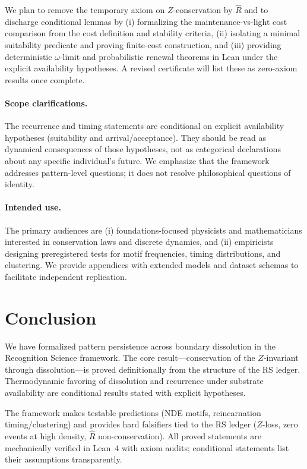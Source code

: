 \documentclass[11pt,letterpaper]{article}
\theoremstyle{definition}
\theoremstyle{remark}
\begin{document}
We plan to remove the temporary axiom on \(Z\)-conservation by \(\widehat{R}\) and to discharge conditional lemmas by (i) formalizing the maintenance-vs-light cost comparison from the cost definition and stability criteria, (ii) isolating a minimal suitability predicate and proving finite-cost construction, and (iii) providing deterministic \(\omega\)-limit and probabilistic renewal theorems in Lean under the explicit availability hypotheses. A revised certificate will list these as zero-axiom results once complete.

\paragraph{Scope clarifications.}
The recurrence and timing statements are conditional on explicit availability hypotheses (suitability and arrival/acceptance). They should be read as dynamical consequences of those hypotheses, not as categorical declarations about any specific individual's future. We emphasize that the framework addresses pattern-level questions; it does not resolve philosophical questions of identity.

\paragraph{Intended use.}
The primary audiences are (i) foundations-focused physicists and mathematicians interested in conservation laws and discrete dynamics, and (ii) empiricists designing preregistered tests for motif frequencies, timing distributions, and clustering. We provide appendices with extended models and dataset schemas to facilitate independent replication.

\section{Conclusion}

We have formalized pattern persistence across boundary dissolution in the Recognition Science framework. The core result—conservation of the \(Z\)-invariant through dissolution—is proved definitionally from the structure of the RS ledger. Thermodynamic favoring of dissolution and recurrence under substrate availability are conditional results stated with explicit hypotheses.

The framework makes testable predictions (NDE motifs, reincarnation timing/clustering) and provides hard falsifiers tied to the RS ledger (\(Z\)-loss, zero events at high density, \(\widehat{R}\) non-conservation). All proved statements are mechanically verified in Lean~4 with axiom audits; conditional statements list their assumptions transparently.
\end{document}
